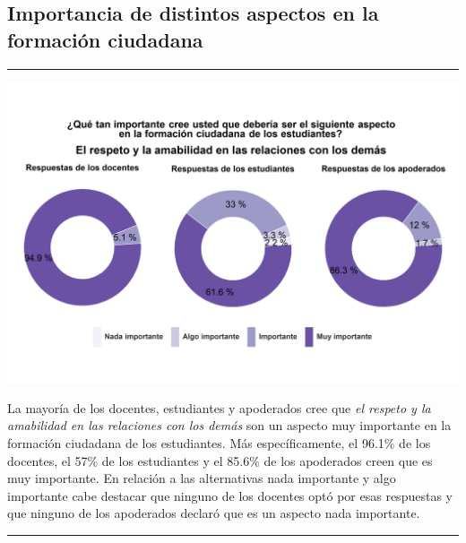 \documentclass[
  14pt,
]{book}
\let\origfigure\figure
\let\endorigfigure\endfigure
\renewenvironment{figure}[1][2] {
  \expandafter\origfigure\expandafter[H]
} {
  \endorigfigure
}
\begin{document}
\hypertarget{importancia-de-distintos-aspectos-en-la-formaciuxf3n-ciudadana}{%
\subsection{Importancia de distintos aspectos en la formación ciudadana}\label{importancia-de-distintos-aspectos-en-la-formaciuxf3n-ciudadana}}

\begin{center}\rule{0.5\linewidth}{0.5pt}\end{center}

\begin{figure}[!ht]

{\centering \includegraphics[width=0.8\linewidth,]{images/graph_for_ciud1} 

}

\caption{Relevancia del respeto en las relaciones con los demás}\label{fig:unnamed-chunk-25}
\end{figure}

La mayoría de los docentes, estudiantes y apoderados cree que \emph{el respeto y la amabilidad en las relaciones con los demás} son un aspecto muy importante en la formación ciudadana de los estudiantes. Más específicamente, el 96.1\% de los docentes, el 57\% de los estudiantes y el 85.6\% de los apoderados creen que es muy importante. En relación a las alternativas nada importante y algo importante cabe destacar que ninguno de los docentes optó por esas respuestas y que ninguno de los apoderados declaró que es un aspecto nada importante.

\begin{center}\rule{0.5\linewidth}{0.5pt}\end{center}
\end{document}
